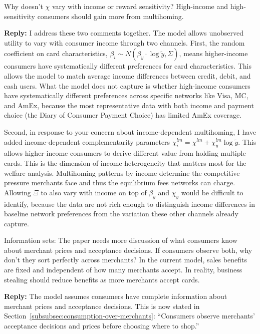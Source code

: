 \documentclass[main.tex]{subfiles}
\begin{document}
\begin{refsection}
\begin{refcommentnoclear}
Why doesn't $\chi$ vary with income or reward sensitivity?
High-income and high-sensitivity consumers should gain more from multihoming.
\end{refcommentnoclear}

\textbf{Reply:} I address these two comments together.
The model allows unobserved utility to vary with consumer income through two channels.
First, the random coefficient on card characteristics, $\beta_i \sim N\left(\beta_y \cdot \log \tilde{y}, \Sigma\right)$, means higher-income consumers have systematically different preferences for card characteristics.
This allows the model to match average income differences between credit, debit, and cash users.
What the model does not capture is whether high-income consumers have systematically different preferences across specific networks like Visa, MC, and AmEx, because the most representative data with both income and payment choice (the Diary of Consumer Payment Choice) has limited AmEx coverage.

Second, in response to your concern about income-dependent multihoming, I have added income-dependent complementarity parameters $\chi^{lm}_i = \chi^{lm} + \chi^{lm}_y \log \tilde{y}$.
This allows higher-income consumers to derive different value from holding multiple cards.
This is the dimension of income heterogeneity that matters most for the welfare analysis.
Multihoming patterns by income determine the competitive pressure merchants face and thus the equilibrium fees networks can charge.
Allowing $\Xi$ to also vary with income on top of $\beta_y$ and $\chi_y$ would be difficult to identify, because the data are not rich enough to distinguish income differences in baseline network preferences from the variation these other channels already capture.

\begin{refcommentnoclear}
Information sets: The paper needs more discussion of what consumers know about merchant prices and acceptance decisions.
If consumers observe both, why don't they sort perfectly across merchants?
In the current model, sales benefits are fixed and independent of how many merchants accept.
In reality, business stealing should reduce benefits as more merchants accept cards.

\end{refcommentnoclear}

\textbf{Reply:} The model assumes consumers have complete information about merchant prices and acceptance decisions.
This is now stated in Section~\ref{subsubsec:consumption-over-merchants}: ``Consumers observe merchants' acceptance decisions and prices before choosing where to shop.''


\end{refsection}
\end{document}
